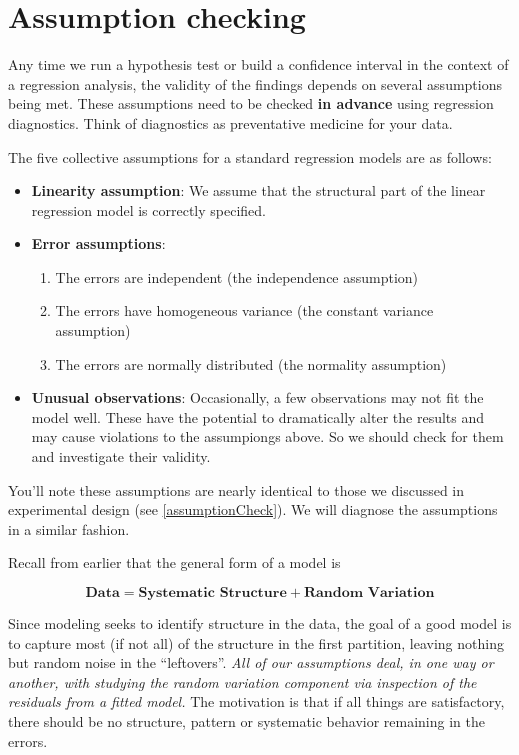 \documentclass[
]{book}
\providecommand{\tightlist}{%
  \setlength{\itemsep}{0pt}\setlength{\parskip}{0pt}}
\begin{document}
\hypertarget{assumption-checking}{%
\section{Assumption checking}\label{assumption-checking}}

Any time we run a hypothesis test or build a confidence interval in the context of a regression analysis, the validity of the findings depends on several assumptions being met.
These assumptions need to be checked \textbf{in advance} using regression diagnostics.
Think of diagnostics as preventative medicine for your data.

The five collective assumptions for a standard regression models are as follows:

\begin{itemize}
\tightlist
\item
  \textbf{Linearity assumption}: We assume that the structural part of the linear regression model is correctly specified.
\item
  \textbf{Error assumptions}:

  \begin{enumerate}
  \def\labelenumi{\arabic{enumi}.}
  \tightlist
  \item
    The errors are independent (the independence assumption)
  \item
    The errors have homogeneous variance (the constant variance assumption)
  \item
    The errors are normally distributed (the normality assumption)
  \end{enumerate}
\item
  \textbf{Unusual observations}: Occasionally, a few observations may not fit the model well. These have the potential to dramatically alter the results and may cause violations to the assumpiongs above. So we should check for them and investigate their validity.
\end{itemize}

You'll note these assumptions are nearly identical to those we discussed in experimental design (see \ref{assumptionCheck}).
We will diagnose the assumptions in a similar fashion.

Recall from earlier that the general form of a model is

\[\textbf{Data} = \textbf{Systematic Structure} + \textbf{Random Variation}\]

Since modeling seeks to identify structure in the data, the goal of a good model is to capture most (if not all) of the structure in the first partition, leaving nothing but random noise in the ``leftovers''.
\emph{All of our assumptions deal, in one way or another, with studying the random variation component via inspection of the residuals from a fitted model.}
The motivation is that if all things are satisfactory, there should be no structure, pattern or systematic behavior remaining in the errors.
\end{document}
